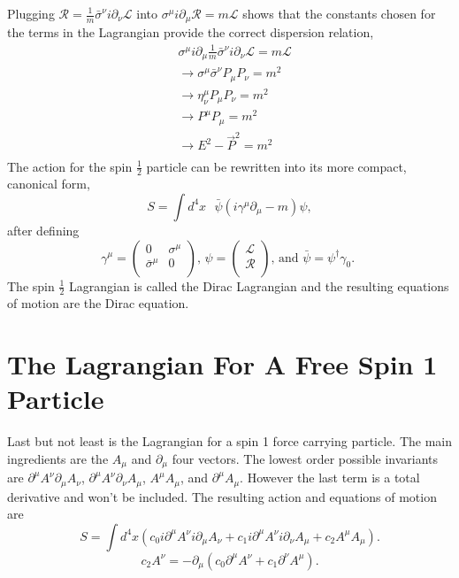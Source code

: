 Plugging $\mathcal{R} = \frac{1}{m}\bar{\sigma}^\nu i\partial_\nu\mathcal{L}$ into $\sigma^\mu i\partial_\mu\mathcal{R} = m\mathcal{L}$ shows that the constants chosen for the terms in the Lagrangian provide the correct dispersion relation,
\begin{equation}
\begin{split}
&\sigma^\mu i\partial_\mu \frac{1}{m}\bar{\sigma}^\nu i\partial_\nu\mathcal{L} = m\mathcal{L} \\
&\rightarrow \sigma^\mu \bar{\sigma}^\nu P_\mu P_\nu = m^2 \\
&\rightarrow \eta^\mu_\nu P_\mu P_\nu = m^2 \\
&\rightarrow P^\mu P_\mu = m^2 \\
&\rightarrow E^2 - \vec{P}^2 = m^2 \\
\end{split}
\end{equation}
The action for the spin $\frac{1}{2}$ particle can be rewritten into its more compact, canonical form,
\begin{equation}
S = \int d^4x \text{ } \bar{\psi} \left(i\gamma^\mu\partial_\mu - m\right)\psi,
\end{equation} 
after defining
\begin{equation}
\gamma^\mu =
\begin{pmatrix}
0 & \sigma^\mu \\
\bar{\sigma}^\mu & 0 \\
\end{pmatrix}
\text{, } 
\psi =
\begin{pmatrix}
\mathcal{L} \\
\mathcal{R} \\
\end{pmatrix}
\text{, and } 
\bar{\psi} =
\psi^\dagger \gamma_0 \text{. }
\end{equation}
The spin $\frac{1}{2}$ Lagrangian is called the Dirac Lagrangian and the resulting equations of motion are the Dirac equation.

\section{The Lagrangian For A Free Spin 1 Particle}
Last but not least is the Lagrangian for a spin 1 force carrying particle. The main ingredients are the $A_\mu$ and $\partial_\mu$ four vectors. The lowest order possible invariants are $\partial^\mu A^\nu\partial_\mu A_\nu$, $\partial^\mu A^\nu\partial_\nu A_\mu$, $A^\mu A_\mu$, and $\partial^\mu A_\mu$. However the last term is a total derivative and won't be included. The resulting action and equations of motion are 
\begin{equation}
S = \int d^4x \left( c_0 i\partial^\mu A^\nu i\partial_\mu A_\nu + c_1 i\partial^\mu A^\nu i\partial_\nu A_\mu + c_2 A^\mu A_\mu \right).
\end{equation}
\begin{equation}
c_2 A^\nu = -\partial_\mu\left(c_0 \partial^\mu A^\nu + c_1 \partial^\nu A^\mu\right).
\end{equation}

